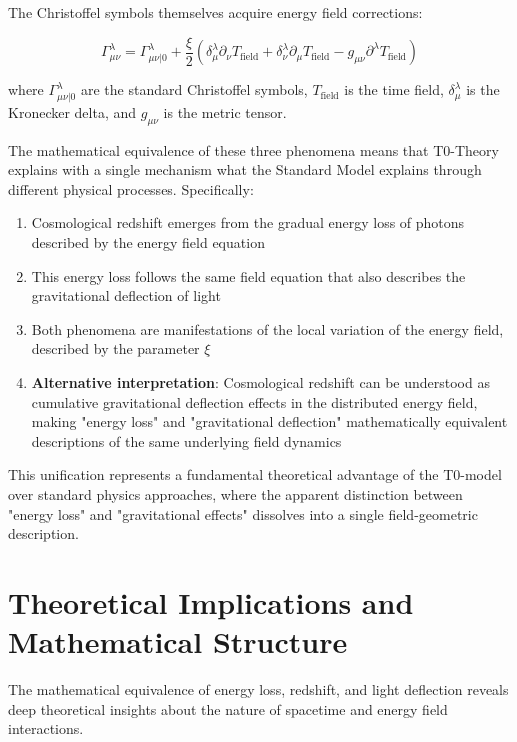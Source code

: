\documentclass[12pt,a4paper]{article}
\newcommand{\tfield}{T_{\text{field}}}
\theoremstyle{definition}
\begin{document}
	The Christoffel symbols themselves acquire energy field corrections:
	
	\begin{equation}
		\Gamma^\lambda_{\mu\nu} = \Gamma^\lambda_{\mu\nu|0} + \frac{\xi}{2} \left(\delta^\lambda_\mu \partial_\nu \tfield + \delta^\lambda_\nu \partial_\mu \tfield - g_{\mu\nu} \partial^\lambda \tfield\right)
	\end{equation}
	
	where $\Gamma^\lambda_{\mu\nu|0}$ are the standard Christoffel symbols, $\tfield$ is the time field, $\delta^\lambda_\mu$ is the Kronecker delta, and $g_{\mu\nu}$ is the metric tensor.
	
	\begin{important}
		The mathematical equivalence of these three phenomena means that T0-Theory explains with a single mechanism what the Standard Model explains through different physical processes. Specifically:
		
		\begin{enumerate}
			\item Cosmological redshift emerges from the gradual energy loss of photons described by the energy field equation
			\item This energy loss follows the same field equation that also describes the gravitational deflection of light
			\item Both phenomena are manifestations of the local variation of the energy field, described by the parameter $\xi$
			\item \textbf{Alternative interpretation}: Cosmological redshift can be understood as cumulative gravitational deflection effects in the distributed energy field, making "energy loss" and "gravitational deflection" mathematically equivalent descriptions of the same underlying field dynamics
		\end{enumerate}
		
		This unification represents a fundamental theoretical advantage of the T0-model over standard physics approaches, where the apparent distinction between "energy loss" and "gravitational effects" dissolves into a single field-geometric description.
	\end{important}
	
	\section{Theoretical Implications and Mathematical Structure}
	
	The mathematical equivalence of energy loss, redshift, and light deflection reveals deep theoretical insights about the nature of spacetime and energy field interactions.
	
\end{document}
